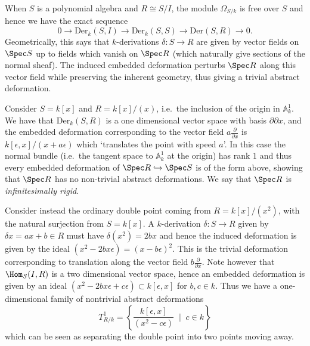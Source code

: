When \(S\) is a polynomial algebra and \(R\cong S/I\), the module
\(\Omega_{S/k}\) is free over \(S\) \cite[Corollary 16.1]{eisen} and hence we
have the exact sequence 
\[0\rightarrow \text{Der}_k(S,I) \rightarrow \text{Der}_k(S,S) \rightarrow
\text{Der}(S,R) \rightarrow 0.\]
Geometrically, this says that \(k\)-derivations \(\delta:S\to R\) are given by 
vector fields on \(\Spec S\) up to fields which vanish on \(\Spec R\) (which
naturally give sections of the normal sheaf). The induced embedded deformation
perturbs \(\Spec R\) along this vector field while preserving the inherent
geometry, thus giving a trivial abstract deformation.

\begin{example}
    Consider $S=k[x]$ and $R=k[x]/(x)$, i.e.\ the inclusion of the origin in
    $\mathbb{A}^1_k$. We have that \(\text{Der}_k(S,R)\) is a one dimensional
    vector space with basis \({\partial}{\partial x}\), and the embedded
    deformation corresponding to the vector field \(a\frac{\partial}{\partial
    x}\) is \(k[\epsilon,x]/(x+a\epsilon)\) which `translates the point with
    speed \(a\)'. In this case the normal bundle (i.e.\ the tangent space to
    \(\mathbb{A}^1_k\) at the origin) has rank \(1\) and thus every embedded
    deformation of \(\Spec R \hookrightarrow \Spec S\) is of the form above,
    showing that \(\Spec R\) has no non-trivial abstract deformations. We say
    that \(\Spec R\) is \textit{infinitesimally rigid}. 

    Consider instead the ordinary double point coming from \(R= k[x]/(x^2)\),
    with the natural surjection from \(S=k[x]\). A \(k\)-derivation
    \(\delta:S\rightarrow R\) given by \(\delta x = ax+b\in R\) must have
    \(\delta(x^2) = 2bx\) and hence the induced deformation is given by the
    ideal \((x^2-2bx\epsilon) = (x-b\epsilon)^2\). This is the trivial
    deformation corresponding to translation along the vector field
    \(b\frac{\partial}{\partial x}\). Note however that \(\Hom_S(I,R)\) is a two
    dimensional vector space, hence an embedded deformation is given by an ideal
    \((x^2-2bx\epsilon + c\epsilon)\subset k[\epsilon, x]\) for \(b,c\in k\).
    Thus we have a one-dimensional family of nontrivial abstract deformations
    \[T^1_{R/k} = \left\{\frac{k[\epsilon,x]}{(x^2-c\epsilon)}\;\mid\; c\in
    k\right\} \] which can be seen as separating the double point into two
    points moving away.  


\end{example}
